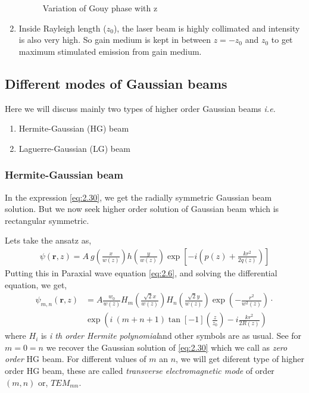 \documentclass[11pt,a4paper]{article}
\numberwithin{equation}{section}
\begin{document}
\begin{enumerate}
	\begin{figure}[H]
		\centering
		\scalebox{0.7}{}
		\caption{Variation of Gouy phase with z}
		\label{fig:gouy}
	\end{figure}
	
	\item 
	Inside Rayleigh length ($z_0$), the laser beam is highly collimated and intensity is also very high. So gain medium is kept in between $z=-z_0$ and $z_0$ to get maximum stimulated emission from gain medium.
\end{enumerate}



\subsection{Different modes of Gaussian beams}
Here we will discuss mainly two types of higher order Gaussian beams \textit{i.e.}
\begin{enumerate}
	\item Hermite-Gaussian (HG) beam
	\item Laguerre-Gaussian (LG) beam
\end{enumerate}

\subsubsection{Hermite-Gaussian beam}
In the expression \ref{eq:2.30}, we get the radially symmetric Gaussian beam solution. But we now seek higher order solution of Gaussian beam which is rectangular symmetric.

Lets take the ansatz as,
 \begin{align}
 	\psi(\boldsymbol{r},z)= A \: g\left(\frac{x}{w(z)}\right) h\left(\frac{y}{w(z)}\right) \exp\left[-i\left(p(z) + \frac{kr^2}{2q(z)}\right)\right]
 \end{align}
Putting this in Paraxial wave equation \ref{eq:2.6}, and solving the differential equation,\cite{milonni} we get,
\begin{align}
	\psi_{m,n}(\boldsymbol{r},z)&= A \frac{w_0}{w(z)} H_m\left(\frac{\sqrt{2} x}{w(z)}\right) H_n\left(\frac{\sqrt{2} y}{w(z)}\right)\exp( -\frac{r^2}{w^2(z)}) \cdot\nonumber\\ 
	&\exp( i\:(m+n+1)\tan[-1](\frac{z}{z_0}) -i\frac{kr^2}{2R(z)})
\end{align}
where $H_i$ is \textit{i th order Hermite polynomial}and other symbols are as usual.
See for $m=0=n$ we recover the Gaussian solution of \ref{eq:2.30} which we call as \textit{zero order} HG beam. For different values of $m$ an $n$, we will get diferent type of higher order HG beam, these are called \textit{transverse electromagnetic mode} of order $(m,n)$ or, $TEM_{mn}$. 
\end{document}
